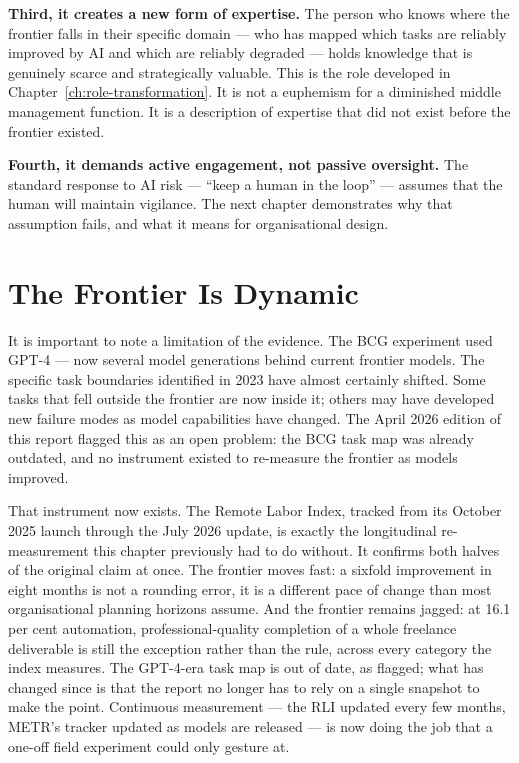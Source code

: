 \textbf{Third, it creates a new form of expertise.} The person who knows where the frontier falls in their specific domain --- who has mapped which tasks are reliably improved by AI and which are reliably degraded --- holds knowledge that is genuinely scarce and strategically valuable. This is the  role developed in Chapter~\ref{ch:role-transformation}. It is not a euphemism for a diminished middle management function. It is a description of expertise that did not exist before the frontier existed.

\textbf{Fourth, it demands active engagement, not passive oversight.} The standard response to AI risk --- ``keep a human in the loop'' --- assumes that the human will maintain vigilance. The next chapter demonstrates why that assumption fails, and what it means for organisational design.

\section{The Frontier Is Dynamic}

It is important to note a limitation of the evidence. The BCG experiment used GPT-4 --- now several model generations behind current frontier models. The specific task boundaries identified in 2023 have almost certainly shifted. Some tasks that fell outside the frontier are now inside it; others may have developed new failure modes as model capabilities have changed. The April 2026 edition of this report flagged this as an open problem: the BCG task map was already outdated, and no instrument existed to re-measure the frontier as models improved.

That instrument now exists. The Remote Labor Index, tracked from its October 2025 launch through the July 2026 update, is exactly the longitudinal re-measurement this chapter previously had to do without. It confirms both halves of the original claim at once. The frontier moves fast: a sixfold improvement in eight months is not a rounding error, it is a different pace of change than most organisational planning horizons assume. And the frontier remains jagged: at 16.1 per cent automation, professional-quality completion of a whole freelance deliverable is still the exception rather than the rule, across every category the index measures. The GPT-4-era task map is out of date, as flagged; what has changed since is that the report no longer has to rely on a single snapshot to make the point. Continuous measurement --- the RLI updated every few months, METR's tracker updated as models are released --- is now doing the job that a one-off field experiment could only gesture at.

